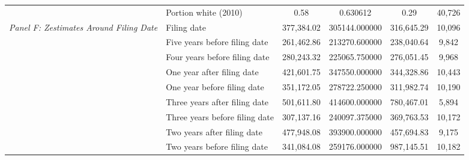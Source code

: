 \begin{tabular}{llcccc}
 & Portion white (2010) & 0.58 & 0.630612 & 0.29 & 40,726 \\
\cline{1-6}
\multirow[c]{9}{4cm}{\textit{Panel F: Zestimates Around Filing Date}} & Filing date & 377,384.02 & 305144.000000 & 316,645.29 & 10,096 \\
 & Five years before filing date & 261,462.86 & 213270.600000 & 238,040.64 & 9,842 \\
 & Four years before filing date & 280,243.32 & 225065.750000 & 276,051.45 & 9,968 \\
 & One year after filing date & 421,601.75 & 347550.000000 & 344,328.86 & 10,443 \\
 & One year before filing date & 351,172.05 & 278722.250000 & 311,982.74 & 10,190 \\
 & Three years after filing date & 501,611.80 & 414600.000000 & 780,467.01 & 5,894 \\
 & Three years before filing date & 307,137.16 & 240097.375000 & 369,763.53 & 10,172 \\
 & Two years after filing date & 477,948.08 & 393900.000000 & 457,694.83 & 9,175 \\
 & Two years before filing date & 341,084.08 & 259176.000000 & 987,145.51 & 10,182 \\
\cline{1-6}
\bottomrule
\end{tabular}
